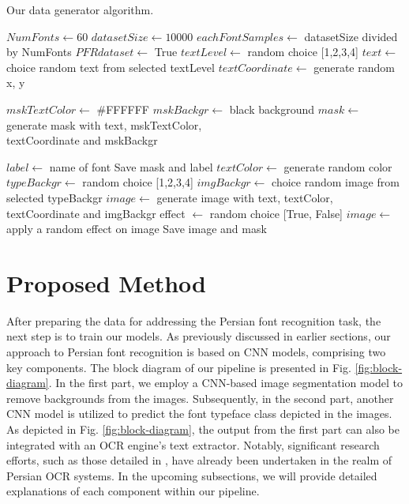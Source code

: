 \documentclass[conference]{IEEEtran}
\begin{document}
\begin{algorithm}
\caption{Our data generator algorithm.}\label{alg1}
\begin{algorithmic}[1]
  \State $NumFonts \gets 60$ 
  \State $ datasetSize \gets 10000 $ 
  \State $ eachFontSamples \gets$ datasetSize divided by NumFonts
  \State $ PFRdataset \gets $ True 
            \State $ textLevel \gets$ random choice [1,2,3,4]
            \State $ text \gets$ choice random text from selected textLevel
            \State $ textCoordinate \gets$ generate random x, y
            
            \State $ mskTextColor \gets$ \#FFFFFF
            \State $ mskBackgr \gets $ black background
            \State $ mask \gets$ generate mask with text, mskTextColor, \\\hspace{7em}textCoordinate and mskBackgr     
            
                \State $label \gets$ name of font
                \State Save mask and label
            \Else
                \State $ textColor \gets$ generate random color
                \State $ typeBackgr \gets$ random choice [1,2,3,4] 
                \State $ imgBackgr \gets $ choice random image from \\\hspace{11.1em}selected typeBackgr   
                \State $ image \gets$ generate image with text, textColor, \\\hspace{9em}textCoordinate and imgBackgr
                \State  effect $\gets $ random choice [True, False]
                    \State $ image \gets$ apply a random effect on image
                \EndIf
                \State Save image and mask
            \EndIf
        \EndFor
  \EndFor
\end{algorithmic}
\end{algorithm} \section{Proposed Method}
After preparing the data for addressing the Persian font recognition task, the next step is to train our models. As previously discussed in earlier sections, our approach to Persian font recognition is based on CNN models, comprising two key components. The block diagram of our pipeline is presented in Fig. \ref{fig:block-diagram}.
In the first part, we employ a CNN-based image segmentation model to remove backgrounds from the images. Subsequently, in the second part, another CNN model is utilized to predict the font typeface class depicted in the images. As depicted in Fig. \ref{fig:block-diagram}, the output from the first part can also be integrated with an OCR engine's text extractor. Notably, significant research efforts, such as those detailed in \cite{16}, have already been undertaken in the realm of Persian OCR systems.
In the upcoming subsections, we will provide detailed explanations of each component within our pipeline.
\end{document}
